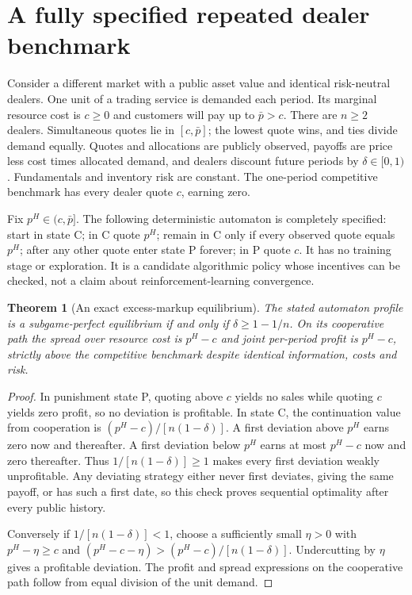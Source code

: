 \documentclass[11pt]{article}
\newtheorem{theorem}{Theorem}
\theoremstyle{remark}\newtheorem{remark}[theorem]{Remark}
\begin{document}
\section*{A fully specified repeated dealer benchmark}
Consider a different market with a public asset value and identical risk-neutral dealers. One unit of a trading service is demanded each period. Its marginal resource cost is $c\ge0$ and customers will pay up to $\bar p>c$. There are $n\ge2$ dealers. Simultaneous quotes lie in $[c,\bar p]$; the lowest quote wins, and ties divide demand equally. Quotes and allocations are publicly observed, payoffs are price less cost times allocated demand, and dealers discount future periods by $\delta\in[0,1)$. Fundamentals and inventory risk are constant. The one-period competitive benchmark has every dealer quote $c$, earning zero.

Fix $p^H\in(c,\bar p]$. The following deterministic automaton is completely specified: start in state C; in C quote $p^H$; remain in C only if every observed quote equals $p^H$; after any other quote enter state P forever; in P quote $c$. It has no training stage or exploration. It is a candidate algorithmic policy whose incentives can be checked, not a claim about reinforcement-learning convergence.

\begin{theorem}[An exact excess-markup equilibrium]
The stated automaton profile is a subgame-perfect equilibrium if and only if $\delta\ge1-1/n$. On its cooperative path the spread over resource cost is $p^H-c$ and joint per-period profit is $p^H-c$, strictly above the competitive benchmark despite identical information, costs and risk.
\end{theorem}
\begin{proof}
In punishment state P, quoting above $c$ yields no sales while quoting $c$ yields zero profit, so no deviation is profitable. In state C, the continuation value from cooperation is $(p^H-c)/[n(1-\delta)]$. A first deviation above $p^H$ earns zero now and thereafter. A first deviation below $p^H$ earns at most $p^H-c$ now and zero thereafter. Thus $1/[n(1-\delta)]\ge1$ makes every first deviation weakly unprofitable. Any deviating strategy either never first deviates, giving the same payoff, or has such a first date, so this check proves sequential optimality after every public history.

Conversely if $1/[n(1-\delta)]<1$, choose a sufficiently small $\eta>0$ with $p^H-\eta\ge c$ and $(p^H-c-\eta)>(p^H-c)/[n(1-\delta)]$. Undercutting by $\eta$ gives a profitable deviation. The profit and spread expressions on the cooperative path follow from equal division of the unit demand.
\end{proof}
\end{document}
